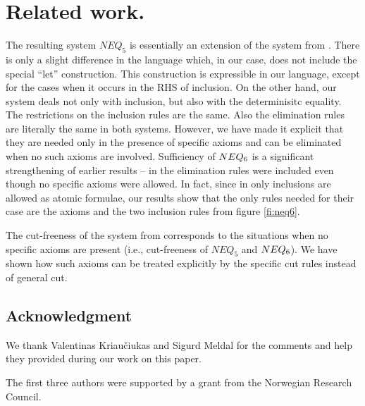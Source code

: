 %

\section{Related work.}
The resulting system $NEQ_5$ is essentially an extension of the system from
\cite{BK95}. There is only a slight difference in the language which, in our case,
does not include the special ``let'' construction. This construction is
expressible in our language, except for the cases when it occurs in the RHS
of inclusion. On the other hand, our system
deals not only with inclusion, but also with the determinisitc equality.
The restrictions on the inclusion rules are the same.
Also the elimination rules are literally the same in both systems. However, we have
made it explicit that they are needed only in the presence of specific axioms
and can be eliminated when no such axioms are involved. Sufficiency of $NEQ_6$ is a significant
strengthening of earlier results -- in \cite{BK95} the elimination rules were included
even though no specific axioms were allowed. In fact, since in \cite{BK95}
only inclusions are allowed as atomic formulae, our results show that the
only rules needed for their case are the axioms and the two inclusion rules
from figure \ref{fi:neq6}.

The cut-freeness of the system from \cite{BK95} corresponds to the situations when
no specific axioms are present (i.e., cut-freeness of $NEQ_5$ and $NEQ_6$). 
We have shown how such axioms can be treated explicitly by
the specific cut rules instead of general cut.

\subsection*{Acknowledgment}
We thank Valentinas Kriau\v ciukas and Sigurd
Meldal for the comments and help they provided during our work on this paper.

The first three authors were supported by a grant from the Norwegian Research Council.

